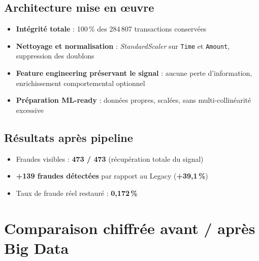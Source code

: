 \subsection{Architecture mise en œuvre}
\begin{itemize}
    \item \textbf{Intégrité totale} : 100\,\% des 284\,807 transactions conservées
    \item \textbf{Nettoyage et normalisation} : \textit{StandardScaler} sur \texttt{Time} et \texttt{Amount}, suppression des doublons
    \item \textbf{Feature engineering préservant le signal} : aucune perte d’information, enrichissement comportemental optionnel
    \item \textbf{Préparation ML-ready} : données propres, scalées, sans multi-collinéarité excessive
\end{itemize}

\subsection{Résultats après pipeline}
\begin{itemize}
    \item Fraudes visibles : \textbf{473 / 473} (récupération totale du signal)
    \item \textbf{+139 fraudes détectées} par rapport au Legacy (\textbf{+39,1\,\%})
    \item Taux de fraude réel restauré : \textbf{0,172\,\%}
\end{itemize}


\clearpage
\vspace{1cm}
\section{Comparaison chiffrée avant / après Big Data}

